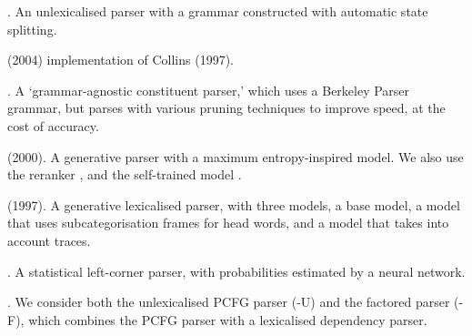 \begin{description}\itemsep1pt
	\item[ Berkeley] \cite{Petrov-etal:2006,Petrov-Klein:2007}. An
	unlexicalised parser with a grammar constructed with automatic state
	splitting.

	\item[ Bikel] (2004)\nocite{Bikel:2004} implementation of Collins (1997).

	\item[ BUBS]
	\cite{Dunlop-Bodenstab-Roark:2011,Bodenstab-Dunlop-Hall-Roark:2011}. A
	`grammar-agnostic constituent parser,' which uses a Berkeley Parser grammar,
	but parses with various pruning techniques to improve speed, at the cost of
	accuracy.

	\item[ Charniak] (2000)\nocite{Charniak:2000}. A generative parser with a
	maximum entropy-inspired model.  We also use the reranker
	\cite{Charniak-Johnson:2005}, and the self-trained model
	\cite{McClosky-Charniak-Johnson:2006}.

	\item[ Collins] (1997)\nocite{Collins:1997}. A generative lexicalised parser, with
	three models, a base model, a model that uses subcategorisation
	frames for head words, and a model that takes into account traces.

	\item[ SSN] \cite{Henderson:2003,Henderson:2004}. A statistical left-corner
	parser, with probabilities estimated by a neural network.

	\item[ Stanford] \cite{Klein-Manning:2003,Klein-Manning:2003:NIPS}. We
	consider both the unlexicalised PCFG parser (-U) and the factored parser
	(-F), which combines the PCFG parser with a lexicalised dependency parser.
\end{description}

